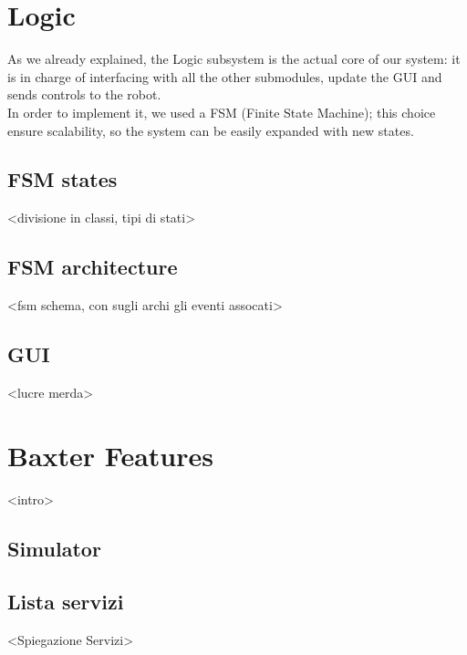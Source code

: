 \documentclass[12pt]{article}
\begin{document}
{\section{Logic}
As we already explained, the Logic subsystem is the actual core of our system: it is in charge of interfacing with all the other submodules, update the GUI and sends controls to the robot. \\
In order to implement it, we used a FSM (Finite State Machine); this choice ensure scalability, so the system can be easily expanded with new states. \\
\subsection{FSM states}
<divisione in classi, tipi di stati>
\subsection{FSM architecture}
<fsm schema, con sugli archi gli eventi assocati>
\subsection{GUI}
<lucre merda>
\section{Baxter Features}
<intro>

\subsection{Simulator}
\subsection{Lista servizi}

<Spiegazione Servizi>
%
%




}
\end{document}
